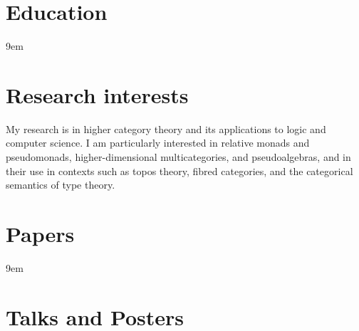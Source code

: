 \documentclass{clean_cv}
\begin{document}
	\section{Education}
	
	\begin{datetabular}{9em}
	\end{datetabular}
	
	\section{Research interests}
	
	My research is in higher category theory and its applications to logic and computer science. I am particularly interested in relative monads and pseudomonads, higher-dimensional multicategories, and pseudoalgebras, and in their use in contexts such as topos theory, fibred categories, and the categorical semantics of type theory.
	
	\section{Papers}
	\nocite{*}
	\begin{datetabular}{9em}
		
	\end{datetabular}
	
	\section{Talks and Posters}
	
\end{document}
